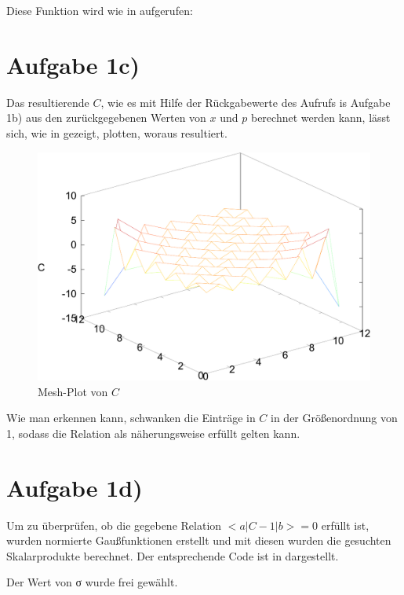 Diese Funktion wird wie in  aufgerufen:


\section*{Aufgabe 1c)}
Das resultierende $C$, wie es mit Hilfe der Rückgabewerte des Aufrufs is Aufgabe 1b)
aus den zurückgegebenen Werten von $x$ und $p$ berechnet werden kann, lässt sich,
wie in  gezeigt, plotten, woraus  resultiert.



\begin{figure}[htb]
  \centering
  \includegraphics[width=0.8\columnwidth,keepaspectratio]{../tmp/mesh_c-crop}
  \caption{Mesh-Plot von $C$}
  \label{fig:mesh_c}
\end{figure}

Wie man erkennen kann, schwanken die Einträge in $C$ in der Größenordnung von 1, sodass
die Relation als näherungsweise erfüllt gelten kann.

\section*{Aufgabe 1d)}
Um zu überprüfen, ob die gegebene Relation $<a|C-1|b>=0$ erfüllt ist, wurden normierte Gaußfunktionen
erstellt und mit diesen wurden die gesuchten Skalarprodukte berechnet. Der entsprechende Code
ist in  dargestellt.



Der Wert von σ wurde frei gewählt.

